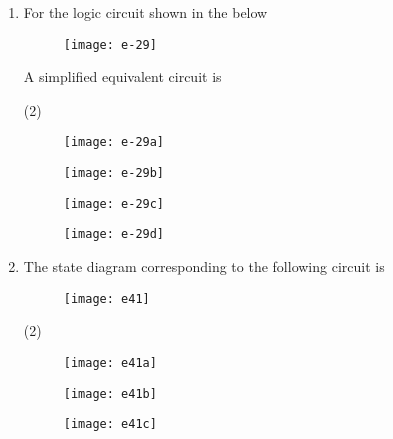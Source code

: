 \begin{enumerate}
	{}
	\begin{tasks}(4)
		\task[\textbf{A.}] $\bar{A} \bar{C}+\overline{B D}$
		\task[\textbf{B.}] $A \bar{B}+C \bar{D}$
		\task[\textbf{C.}]  $A D+B C$
		\task[\textbf{D.}] $\overline{B D}+B D$
	\end{tasks}
	\item For the logic circuit shown in the below\\
	\begin{figure}[H]
		\centering
		\texttt{[image: e-29]}
	\end{figure}
	A simplified equivalent circuit is
	{	}
	\begin{tasks}(2)
		\task[\textbf{A.}] 
		\begin{figure}[H]
			\centering
			\texttt{[image: e-29a]}
		\end{figure}
		\task[\textbf{B.}] \begin{figure}[H]
			\centering
			\texttt{[image: e-29b]}
		\end{figure}
		\task[\textbf{C.}] \begin{figure}[H]
			\centering
			\texttt{[image: e-29c]}
		\end{figure}
		\task[\textbf{D.}] \begin{figure}[H]
			\centering
			\texttt{[image: e-29d]}
		\end{figure}
	\end{tasks}
	\item The state diagram corresponding to the following circuit is
	{	}
	\begin{figure}[H]
		\centering
		\texttt{[image: e41]}
	\end{figure}
	\begin{tasks}(2)
		\task[\textbf{A.}] \begin{figure}[H]
			\centering
			\texttt{[image: e41a]}
		\end{figure}
		\task[\textbf{B.}] \begin{figure}[H]
			\centering
			\texttt{[image: e41b]}
		\end{figure}
		\task[\textbf{C.}] \begin{figure}[H]
			\centering
			\texttt{[image: e41c]}
		\end{figure}
		\task[\textbf{D.}] \begin{figure}[H]

\end{figure}
\end{tasks}
\end{enumerate}
